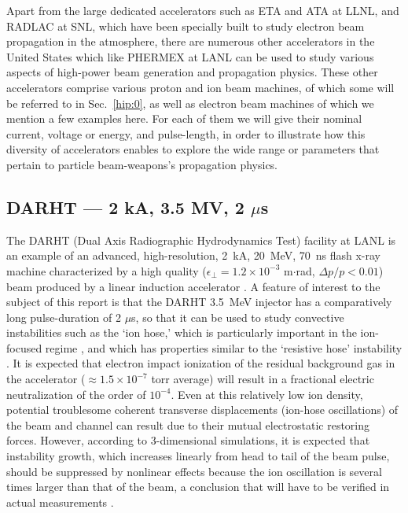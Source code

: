 \documentclass [12pt,a4paper,     ]{report} %
\begin{document}
Apart from the large dedicated accelerators such as ETA and ATA at LLNL, and RADLAC at SNL, which have been specially built to study electron beam propagation in the atmosphere, there are numerous other accelerators in the United States which like PHERMEX at LANL can be used to study various aspects of high-power beam generation and propagation physics.  These other accelerators comprise various proton and ion beam machines, of which some will be referred to in Sec.~\ref{hip:0}, as well as electron beam machines of which we mention a few examples here.  For each of them we will give their nominal current, voltage or energy, and pulse-length, in order to illustrate how this diversity of accelerators enables to explore the wide range or parameters that pertain to particle beam-weapons's propagation physics.


\subsection{DARHT ---  2 kA, 3.5 MV, 2 $\mu$s}

The DARHT (Dual Axis Radiographic Hydrodynamics Test) facility at LANL is an example of an advanced, high-resolution, 2~kA, 20~MeV, 70~ns flash x-ray machine characterized by a high quality ($\epsilon_{\perp}=1.2\times 10^{-3}$ m$\cdot$rad, $\Delta p/p < 0.01$)  beam produced by a linear induction accelerator \cite{YU---1996-}.  A feature of interest to the subject of this report is that the DARHT 3.5~MeV injector has a comparatively long pulse-duration of 2 $\mu$s, so that it can be used to study convective instabilities such as the `ion hose,' which is particularly important in the ion-focused regime \cite{BUDKE1956A,ROSE-2004-}, and which has properties similar to the `resistive hose' instability \cite{LEE--1978-}. It is expected that electron impact ionization of the residual background gas in the accelerator ($\approx 1.5 \times 10^{-7}$ torr average) will result in a fractional electric neutralization of the order of $10^{-4}$.  Even at this relatively low ion density, potential troublesome coherent transverse displacements (ion-hose oscillations) of the beam and channel can result due to their mutual electrostatic restoring forces.  However,  according to 3-dimensional simulations, it is expected that instability growth, which increases linearly from head to tail of the beam pulse, should be suppressed by nonlinear effects because the ion oscillation is several times larger than that of the beam, a conclusion that will have to be verified in actual measurements \cite{HUGHE2001-}.  
\end{document}
